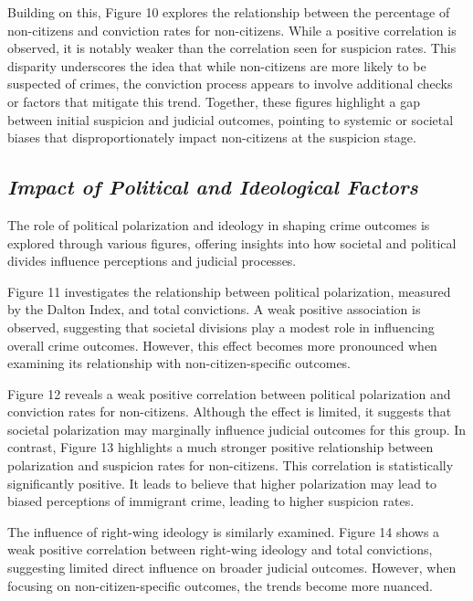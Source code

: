 \documentclass[
]{article}
\begin{document}
Building on this, Figure 10 explores the relationship between the
percentage of non-citizens and conviction rates for non-citizens. While
a positive correlation is observed, it is notably weaker than the
correlation seen for suspicion rates. This disparity underscores the
idea that while non-citizens are more likely to be suspected of crimes,
the conviction process appears to involve additional checks or factors
that mitigate this trend. Together, these figures highlight a gap
between initial suspicion and judicial outcomes, pointing to systemic or
societal biases that disproportionately impact non-citizens at the
suspicion stage.

\subsection{\texorpdfstring{\emph{Impact of Political and Ideological
Factors}}{Impact of Political and Ideological Factors}}\label{impact-of-political-and-ideological-factors}

The role of political polarization and ideology in shaping crime
outcomes is explored through various figures, offering insights into how
societal and political divides influence perceptions and judicial
processes.

Figure 11 investigates the relationship between political polarization,
measured by the Dalton Index, and total convictions. A weak positive
association is observed, suggesting that societal divisions play a
modest role in influencing overall crime outcomes. However, this effect
becomes more pronounced when examining its relationship with
non-citizen-specific outcomes.

Figure 12 reveals a weak positive correlation between political
polarization and conviction rates for non-citizens. Although the effect
is limited, it suggests that societal polarization may marginally
influence judicial outcomes for this group. In contrast, Figure 13
highlights a much stronger positive relationship between polarization
and suspicion rates for non-citizens. This correlation is statistically
significantly positive. It leads to believe that higher polarization may
lead to biased perceptions of immigrant crime, leading to higher
suspicion rates.

The influence of right-wing ideology is similarly examined. Figure 14
shows a weak positive correlation between right-wing ideology and total
convictions, suggesting limited direct influence on broader judicial
outcomes. However, when focusing on non-citizen-specific outcomes, the
trends become more nuanced.
\end{document}
